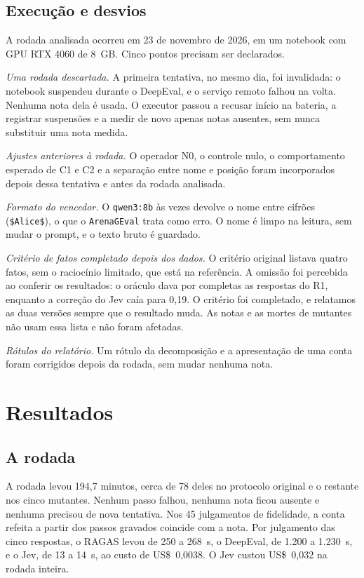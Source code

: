 \documentclass[12pt]{article}
\newcommand{\code}[1]{\texttt{\small #1}}
\begin{document}
\subsection{Execução e desvios}
\label{sec:desvios}

A rodada analisada ocorreu em 23 de novembro de 2026, em um notebook com GPU RTX
4060 de 8~GB. Cinco pontos precisam ser declarados.

\emph{Uma rodada descartada.} A primeira tentativa, no mesmo dia, foi invalidada: o
notebook suspendeu durante o DeepEval, e o serviço remoto falhou na volta. Nenhuma
nota dela é usada. O executor passou a recusar início na bateria, a registrar
suspensões e a medir de novo apenas notas ausentes, sem nunca substituir uma nota
medida.

\emph{Ajustes anteriores à rodada.} O operador N0, o controle nulo, o comportamento
esperado de C1 e C2 e a separação entre nome e posição foram incorporados depois
dessa tentativa e antes da rodada analisada.

\emph{Formato do vencedor.} O \code{qwen3:8b} às vezes devolve o nome entre
cifrões (\code{\$Alice\$}), o que o \code{ArenaGEval} trata como erro. O nome é
limpo na leitura, sem mudar o prompt, e o texto bruto é guardado.

\emph{Critério de fatos completado depois dos dados.} O critério original listava
quatro fatos, sem o raciocínio limitado, que está na referência. A omissão foi
percebida ao conferir os resultados: o oráculo dava por completas as respostas do
R1, enquanto a correção do Jev caía para 0,19. O critério foi completado, e
relatamos as duas versões sempre que o resultado muda. As notas e as mortes de
mutantes não usam essa lista e não foram afetadas.

\emph{Rótulos do relatório.} Um rótulo da decomposição e a apresentação de uma
conta foram corrigidos depois da rodada, sem mudar nenhuma nota.

\section{Resultados}
\label{sec:resultados}

\subsection{A rodada}

A rodada levou 194,7 minutos, cerca de 78 deles no protocolo original e o restante
nos cinco mutantes. Nenhum passo falhou, nenhuma nota ficou ausente e nenhuma
precisou de nova tentativa. Nos 45 julgamentos de fidelidade, a conta refeita a
partir dos passos gravados coincide com a nota. Por julgamento das cinco respostas,
o RAGAS levou de 250 a 268~s, o DeepEval, de 1.200 a 1.230~s, e o Jev, de 13 a 14~s,
ao custo de US\$~0,0038. O Jev custou US\$~0,032 na rodada inteira.
\end{document}
